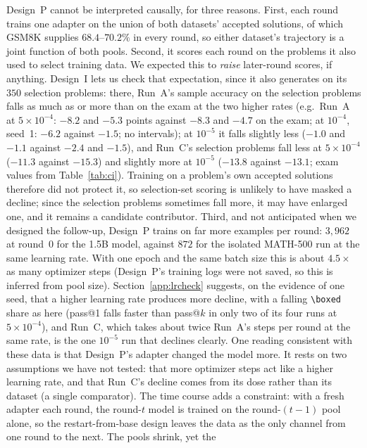 \documentclass[runningheads]{llncs}
\begin{document}
Design~P cannot be interpreted causally, for three reasons. First, each round
trains one adapter on the union of both datasets' accepted solutions, of which
GSM8K supplies $68.4$--$70.2\%$ in every round, so either dataset's trajectory is
a joint function of both pools. Second, it scores each round on the problems it
also used to select training data. We expected this to \emph{raise} later-round
scores, if anything. Design~I lets us check that expectation, since it also
generates on its $350$ selection problems: there, Run~A's sample accuracy on the
selection problems falls as much as or more than on the exam at the two higher rates (e.g.\ Run~A at
$5\times10^{-4}$: $-8.2$ and $-5.3$ points against $-8.3$ and $-4.7$ on the
exam; at $10^{-4}$, seed~1: $-6.2$ against $-1.5$; no intervals); at
$10^{-5}$ it falls slightly less ($-1.0$ and $-1.1$ against $-2.4$ and $-1.5$),
and Run~C's selection problems fall less at $5\times10^{-4}$ ($-11.3$ against
$-15.3$) and slightly more at $10^{-5}$ ($-13.8$ against $-13.1$; exam values
from Table~\ref{tab:ci}). Training on a problem's own accepted solutions therefore
did not protect it, so selection-set scoring is unlikely to have masked a
decline; since the selection problems sometimes fall more, it may have
enlarged one, and it remains a candidate contributor. Third, and not anticipated when we designed the follow-up, Design~P
trains on far more examples per round: $3{,}962$ at round~0 for the 1.5B model,
against $872$ for the isolated MATH-500 run at the same learning rate. With one
epoch and the same batch size this is about $4.5\times$ as many optimizer steps
(Design~P's training logs were not saved, so this is inferred from pool size).
Section~\ref{app:lrcheck} suggests, on the evidence of one seed, that a higher
learning rate produces more decline, with a falling \verb|\boxed| share as here
(pass@1 falls faster than pass@$k$ in only two of its four runs at
$5\times10^{-4}$), and Run~C, which takes about twice Run~A's steps per round
at the same rate, is the one $10^{-5}$ run that declines clearly. One reading
consistent with these data is that Design~P's adapter changed the model more.
It rests on two assumptions we have not tested: that more optimizer steps act
like a higher learning rate, and that Run~C's decline comes from its dose
rather than its dataset (a single comparator). The time course adds a
constraint: with a fresh adapter each round, the round-$t$ model is trained on
the round-$(t-1)$ pool alone, so the restart-from-base design leaves the data
as the only channel from one round to the next. The pools shrink, yet the
\end{document}
